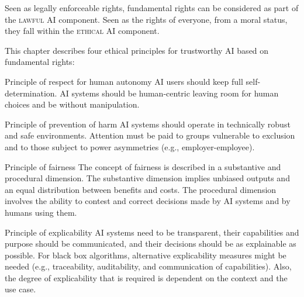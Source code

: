 \begin{remark}
    Seen as legally enforceable rights, fundamental rights can be considered as part of the \textsc{lawful} AI component. Seen as the rights of everyone, from a moral status, they fall within the \textsc{ethical} AI component.
\end{remark}

This chapter describes four ethical principles for trustworthy AI based on fundamental rights:
\begin{descriptionlist}
    \item[Principle of respect for human autonomy] 
        AI users should keep full self-determination. AI systems should be human-centric leaving room for human choices and be without manipulation.

    
    \item[Principle of prevention of harm] 
        AI systems should operate in technically robust and safe environments. Attention must be paid to groups vulnerable to exclusion and to those subject to power asymmetries (e.g., employer-employee).


    \item[Principle of fairness] 
        The concept of fairness is described in a substantive and procedural dimension. The substantive dimension implies unbiased outputs and an equal distribution between benefits and costs. The procedural dimension involves the ability to contest and correct decisions made by AI systems and by humans using them.


    \item[Principle of explicability] 
        AI systems need to be transparent, their capabilities and purpose should be communicated, and their decisions should be as explainable as possible. For black box algorithms, alternative explicability measures might be needed (e.g., traceability, auditability, and communication of capabilities). Also, the degree of explicability that is required is dependent on the context and the use case.
\end{descriptionlist}

